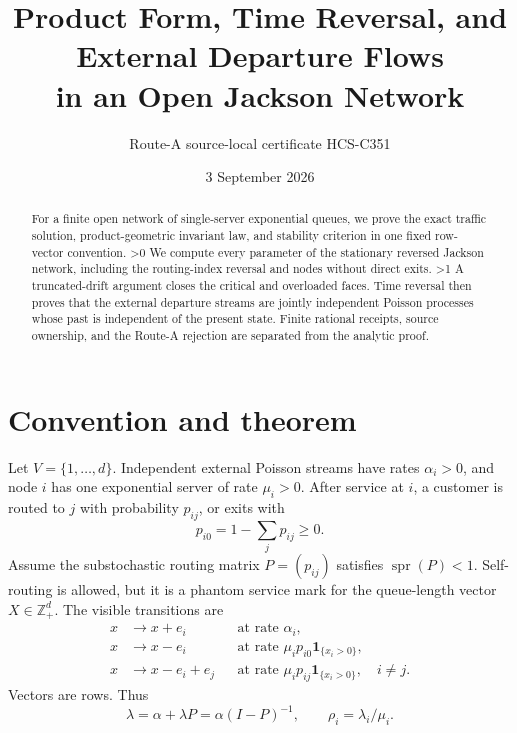 \documentclass[10pt]{article}
\title{Product Form, Time Reversal, and External Departure Flows\\
in an Open Jackson Network}
\author{Route-A source-local certificate HCS-C351}
\date{3 September 2026}
\providecommand{\CRevisionRound}{2}
\newcommand{\ZZ}{\mathbb Z}
\newcommand{\one}{\mathbf 1}
\newcommand{\spr}{\operatorname{spr}}
\begin{document}
\maketitle
\begin{abstract}
For a finite open network of single-server exponential queues, we prove the
exact traffic solution, product-geometric invariant law, and stability
criterion in one fixed row-vector convention.
\ifnum\CRevisionRound>0
We compute every parameter of the stationary reversed Jackson network,
including the routing-index reversal and nodes without direct exits.
\fi
\ifnum\CRevisionRound>1
A truncated-drift argument closes the critical and overloaded faces. Time
reversal then proves that the external departure streams are jointly
independent Poisson processes whose past is independent of the present state.
Finite rational receipts, source ownership, and the Route-A rejection are
separated from the analytic proof.
\fi
\end{abstract}

\section{Convention and theorem}
Let \(V=\{1,\ldots,d\}\). Independent external Poisson streams have rates
\(\alpha_i>0\), and node \(i\) has one exponential server of rate \(\mu_i>0\).
After service at \(i\), a customer is routed to \(j\) with probability
\(p_{ij}\), or exits with
\[
 p_{i0}=1-\sum_jp_{ij}\ge0.
\]
Assume the substochastic routing matrix \(P=(p_{ij})\) satisfies
\(\spr(P)<1\). Self-routing is allowed, but it is a phantom service mark for
the queue-length vector \(X\in\ZZ_+^d\). The visible transitions are
\begin{equation}\label{eq:generator}
\begin{aligned}
x&\longrightarrow x+e_i &&\text{at rate }\alpha_i,\\
x&\longrightarrow x-e_i &&\text{at rate }\mu_ip_{i0}\one_{\{x_i>0\}},\\
x&\longrightarrow x-e_i+e_j &&\text{at rate }
 \mu_ip_{ij}\one_{\{x_i>0\}},\quad i\ne j .
\end{aligned}
\end{equation}
Vectors are rows. Thus
\begin{equation}\label{eq:traffic}
 \lambda=\alpha+\lambda P=\alpha(I-P)^{-1},\qquad
 \rho_i=\lambda_i/\mu_i .
\end{equation}
\end{document}
